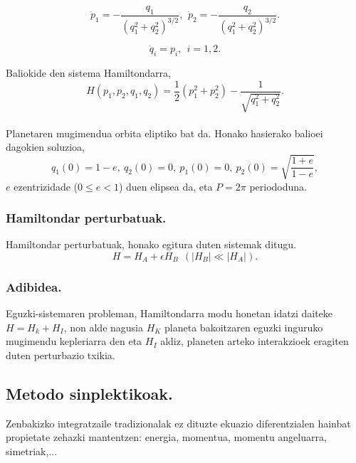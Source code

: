 \begin{equation}
\dot{p}_1= -\frac{q_1}{(q_1^2+q_2^2)^{3/2}}, \ \, \dot{p}_2= -\frac{q_2}{(q_1^2+q_2^2)^{3/2}}.
\end{equation}
  
\begin{equation}
\dot{q}_i=p_i, \ \ i=1,2.
\end{equation}

Baliokide den sistema Hamiltondarra,
\begin{equation}
H(p_1,p_2,q_1,q_2)=\frac{1}{2}(p_1^2+p_2^2)-\frac{1}{\sqrt{q_1^2+q_2^2}}.
\end{equation}

\paragraph*{} Planetaren mugimendua orbita eliptiko bat da. Honako hasierako balioei dagokien soluzioa,
\begin{equation*}
q_1(0)=1-e, \ q_2(0)=0, \ p_1(0)=0, \ p_2(0)=\sqrt{ \frac{1+e}{1-e}}, 
\end{equation*}
$e$ ezentrizidade ($0\le e < 1$) duen elipsea da, eta $P=2\pi$ periododuna. 
 
\subsubsection*{Hamiltondar perturbatuak.}

Hamiltondar perturbatuak, honako egitura duten sistemak ditugu.
\begin{equation*}
H=H_A+\epsilon H_B \ \ (|H_B|\ll |H_A|).
\end{equation*}

\subsubsection*{Adibidea.} Eguzki-sistemaren probleman, Hamiltondarra modu honetan idatzi daiteke $H=H_k+H_I$, non alde nagusia $H_K$ planeta bakoitzaren eguzki inguruko mugimendu kepleriarra den eta $H_I$ aldiz, planeten arteko interakzioek eragiten duten perturbazio txikia.   

\subsection{Metodo sinplektikoak.}

Zenbakizko integratzaile tradizionalak ez dituzte ekuazio diferentzialen hainbat propietate zehazki mantentzen: energia, momentua, momentu angeluarra, simetriak,... 

